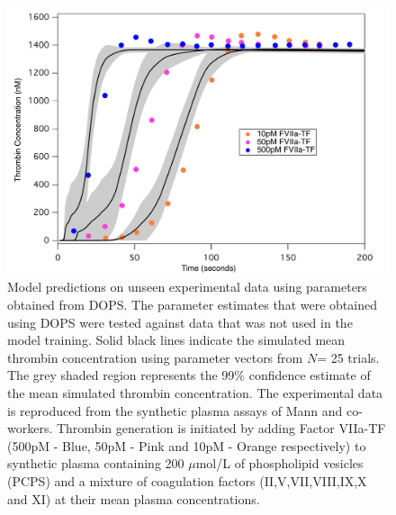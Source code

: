 \documentclass[12pt]{article}
\begin{document}
\begin{figure}[h]
\centering
\includegraphics[width=1.0\textwidth]{./figs/Figure_6_Sim_Validate_E2_E4_E6.pdf}
\caption{Model predictions on unseen experimental data using parameters obtained from DOPS. The parameter estimates that were obtained using DOPS were tested against data that was not used in the model training. Solid black lines indicate the simulated mean thrombin concentration using parameter vectors from $N$= 25 trials. The grey shaded region represents the 99\% confidence estimate of the mean simulated thrombin concentration. The experimental data is reproduced from the synthetic plasma assays of Mann and co-workers. Thrombin generation is initiated by adding Factor VIIa-TF (500pM - Blue, 50pM - Pink and 10pM - Orange respectively) to synthetic plasma containing 200 $\mu$mol/L of phospholipid vesicles (PCPS) and a mixture of coagulation factors (II,V,VII,VIII,IX,X and XI) at their mean plasma concentrations.
}\label{fig-validation}
\end{figure}

\clearpage
\end{document}
